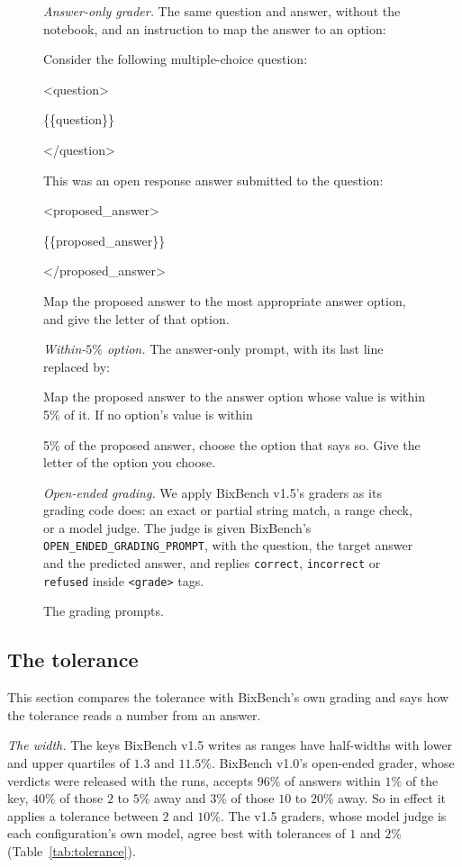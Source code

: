 \documentclass{article}
\begin{document}
\begin{figure}[htbp]
{\begin{minipage}{0.95\linewidth}
\smallskip
\emph{Answer-only grader.} The same question and answer, without the notebook, and an instruction to map the answer
to an option:

{\ttfamily\scriptsize Consider the following multiple-choice question:\par\smallskip
<question>\par \{\{question\}\}\par </question>\par\smallskip
This was an open response answer submitted to the question:\par\smallskip
<proposed\_answer>\par \{\{proposed\_answer\}\}\par </proposed\_answer>\par\smallskip
Map the proposed answer to the most appropriate answer option, and give the letter of that option.\par}

\smallskip
\emph{Within-$5\%$ option.} The answer-only prompt, with its last line replaced by:

{\ttfamily\scriptsize Map the proposed answer to the answer option whose value is within 5\% of it. If no option's
value is within\par
5\% of the proposed answer, choose the option that says so. Give the letter of the option you choose.\par}

\smallskip
\emph{Open-ended grading.} We apply BixBench v1.5's graders as its grading code does: an exact or partial string
match, a range check, or a model judge. The judge is given BixBench's \texttt{OPEN\_ENDED\_GRADING\_PROMPT}, with the
question, the target answer and the predicted answer, and replies \texttt{correct}, \texttt{incorrect} or
\texttt{refused} inside \texttt{<grade>} tags.
\end{minipage}}
\caption{The grading prompts.}
\label{fig:gradingprompts}
\end{figure}

\subsection{The tolerance}
\label{app:reference}

This section compares the tolerance with BixBench's own grading and says how the tolerance reads a number from an
answer.

\emph{The width.} The keys BixBench v1.5 writes as ranges have half-widths with lower and upper quartiles of $1.3$ and
$11.5\%$. BixBench v1.0's open-ended grader, whose verdicts were released with the runs, accepts $96\%$ of answers
within $1\%$ of the key, $40\%$ of those $2$ to $5\%$ away and $3\%$ of those $10$ to $20\%$ away. So in effect it
applies a tolerance between $2$ and $10\%$. The v1.5 graders, whose model judge is each configuration's own model, agree best with tolerances of $1$ and $2\%$
(Table~\ref{tab:tolerance}).
\end{document}
